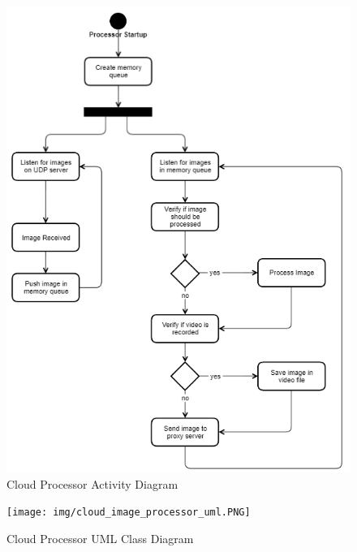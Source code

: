 \begin{figure}[ht]
    \label{fig:cloud-processor-activity-diagram}
    \includegraphics[keepaspectratio]{img/cloud-processor-activity.PNG}
    \caption{Cloud Processor Activity Diagram}
\end{figure}

\begin{figure}[ht]
    \label{fig:cloud-processor-uml-class-diagram}
    \texttt{[image: img/cloud\_image\_processor\_uml.PNG]}
    \caption{Cloud Processor UML Class Diagram}
\end{figure}

